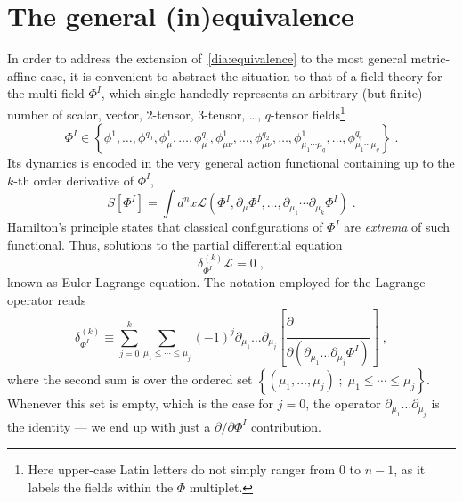 \documentclass[../../main.tex]{subfiles}
\begin{document}
\section{The general (in)equivalence}\label{sec:on-shell_equivalence}

In order to address the extension of~\ref{dia:equivalence} to the most general metric-affine case, it is convenient to abstract the situation to that of a field theory for the multi-field $\Phi^I$, which single-handedly represents an arbitrary (but finite) number of scalar, vector, 2-tensor, 3-tensor, \dots, $q$-tensor fields\footnote{Here upper-case Latin letters do not simply ranger from $0$ to $n-1$, as it labels the fields within the $\Phi$ multiplet.}
\begin{equation}
  \Phi^I \in \left\{\phi^1,\ldots,\phi^{q_0},\phi_\mu^1, \ldots,\phi^{q_1}_\mu,\phi^1_{\mu\nu},\ldots, \phi^{q_2}_{\mu\nu}, \ldots, \phi^1_{\mu_1\cdots \mu_q},\ldots,\phi^{q_q}_{\mu_1\cdots \mu_q} \right\} \;.
\end{equation}
Its dynamics is encoded in the very general action functional containing up to the $k$-th order derivative of $\Phi^I$,
\begin{equation}
  S\left[\Phi^I\right] = \int d^n x \mathcal{L} \left(\Phi^I, \partial_\mu \Phi^I , \ldots  ,\partial_{\mu_1}\cdots\partial_{\mu_k} \Phi^I  \right)\;.
\end{equation}
Hamilton's principle states that classical configurations of $\Phi^I$ are \textit{extrema} of such functional. Thus, solutions to the partial differential equation
\begin{equation}
  \label{eq:el-equations}
  \delta^{(k)}_{\Phi^I}\mathcal{L}=0 \;,
\end{equation}
known as Euler-Lagrange equation. The notation employed for the Lagrange operator reads
\begin{equation}
  \delta^{(k)}_{\Phi^I} \equiv \sum_{j=0}^{k} \sum_{\mu_1 \leq \cdots \leq \mu_j} {\left( -1 \right)}^j \partial_{\mu_1} \ldots \partial_{\mu_j} \left[ \frac{ \partial \phantom{ \left( \partial_{\mu_1} \ldots \partial_{\mu_j} \Phi^I \right) } }{ \partial \left( \partial_{\mu_1} \ldots \partial_{\mu_j} \Phi^I \right) } \right] \;,
\end{equation}
where the second sum is over the ordered set $\left\{ \left( \mu_1,\ldots,\mu_j \right) \; ; \; \mu_1 \leq \cdots \leq \mu_j \right\}$. Whenever this set is empty, which is the case for $j=0$, the operator $\partial_{\mu_1} \ldots \partial_{\mu_j}$ is the identity --- we end up with just a $\partial/\partial \Phi^I$ contribution.
\end{document}
